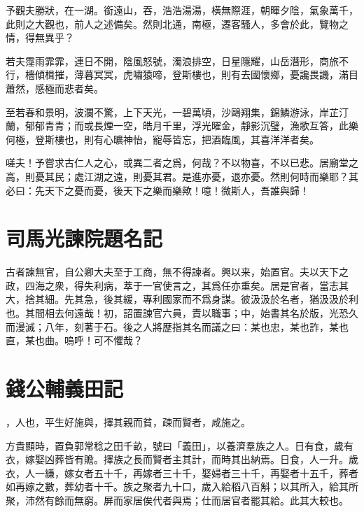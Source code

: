 予觀夫勝狀，在一湖。銜遠山，吞，浩浩湯湯，橫無際涯，朝暉夕陰，氣象萬千，此則之大觀也，前人之述備矣。然則北通，南極，遷客騷人，多會於此，覽物之情，得無異乎？

若夫霪雨霏霏，連日不開，陰風怒號，濁浪排空，日星隱耀，山岳潛形，商旅不行，檣傾楫摧，薄暮冥冥，虎嘯猿啼，登斯樓也，則有去國懷鄉，憂讒畏譏，滿目蕭然，感極而悲者矣。

至若春和景明，波瀾不驚，上下天光，一碧萬頃，沙鷗翔集，錦鱗游泳，岸芷汀蘭，郁郁青青；而或長煙一空，皓月千里，浮光曜金，靜影沉璧，漁歌互答，此樂何極，登斯樓也，則有心曠神怡，寵辱皆忘，把酒臨風，其喜洋洋者矣。

嗟夫！予嘗求古仁人之心，或異二者之爲，何哉？不以物喜，不以已悲。居廟堂之高，則憂其民；處江湖之遠，則憂其君。是進亦憂，退亦憂。然則何時而樂耶？其必曰：先天下之憂而憂，後天下之樂而樂歟！噫！微斯人，吾誰與歸！%

\section[諫院題名記\quad{\small 司馬光}]{{\normalsize 司馬光}\quad 諫院題名記}
古者諫無官，自公卿大夫至于工商，無不得諫者。興以来，始置官。夫以天下之政，四海之衆，得失利病，萃于一官使言之，其爲任亦重矣。居是官者，當志其大，{捨}其細。先其急，後其緩，專利國家而不爲身謀。彼汲汲於名者，猶汲汲於利也。其間相去何遠哉！初，詔置諫官六員，責以職事；中，始書其名於版，光恐久而漫滅；八年，刻著于石。後之人將歴指其名而議之曰：某也忠，某也詐，某也直，某也曲。嗚呼！可不懼哉？

\section[義田記\quad{\small 錢公輔}]{{\normalsize 錢公輔}\quad 義田記}
，人也，平生好施與，擇其親而貧，疎而賢者，咸施之。

方貴顯時，置負郭常稔之田千畝，號曰「義田」，以養濟羣族之人。日有食，歲有衣，嫁娶凶葬皆有贍。擇族之長而賢者主其計，而時{其}出納焉。日食，人一升。歲衣，人一縑，嫁女者五十千，再嫁者三十千，娶婦者三十千，再娶者十五千，葬者如再嫁之數，葬幼者十千。族之聚者九十口，歲入給稻八百斛；以其所入，給其所聚，沛然有餘而無窮。屏而家居俟代者與焉；仕而居官者罷{其}給。此其大較也。

